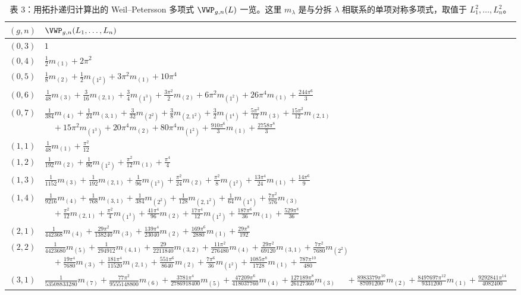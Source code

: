 \clearpage
\begin{table}[t]\centering\small
\caption*{表 3：用拓扑递归计算出的 Weil--Petersson 多项式 $\VWP_{g,n}(L)$ 一览。这里 $m_\lambda$ 是与分拆 $\lambda$ 相联系的单项对称多项式，取值于 $L_1^2,\dots,L_n^2$。}
\begin{tabular}{@{}c|>{\raggedright\arraybackslash}p{\dimexpr\textwidth-2.9cm\relax}@{}}
\toprule
$(g,n)$ & $\VWP_{g,n}(L_1,\dots,L_n)$ \\
\midrule
$(0,3)$ & $1$ \\
$(0,4)$ & $\frac12m_{(1)}+2\pi^2$ \\
$(0,5)$ & $\frac18m_{(2)}+\frac12m_{(1^2)}+3\pi^2m_{(1)}+10\pi^4$ \\
$(0,6)$ & $\frac1{48}m_{(3)}+\frac3{16}m_{(2,1)}+\frac34m_{(1^3)}+\frac{3\pi^2}{2}m_{(2)}+6\pi^2m_{(1^2)}+26\pi^4m_{(1)}+\frac{244\pi^6}{3}$ \\
$(0,7)$ & $\frac1{384}m_{(4)}+\frac1{24}m_{(3,1)}+\frac3{32}m_{(2^2)}+\frac38m_{(2,1^2)}+\frac32m_{(1^4)}+\frac{5\pi^2}{12}m_{(3)}+\frac{15\pi^2}{12}m_{(2,1)}$ \newline
$\quad+15\pi^2m_{(1^3)}+20\pi^4m_{(2)}+80\pi^4m_{(1^2)}+\frac{910\pi^6}{3}m_{(1)}+\frac{2758\pi^8}{3}$ \\
\midrule
$(1,1)$ & $\frac1{48}m_{(1)}+\frac{\pi^2}{12}$ \\
$(1,2)$ & $\frac1{192}m_{(2)}+\frac1{96}m_{(1^2)}+\frac{\pi^2}{12}m_{(1)}+\frac{\pi^4}{4}$ \\
$(1,3)$ & $\frac1{1152}m_{(3)}+\frac1{192}m_{(2,1)}+\frac1{96}m_{(1^3)}+\frac{\pi^2}{24}m_{(2)}+\frac{\pi^2}{8}m_{(1^2)}+\frac{13\pi^4}{24}m_{(1)}+\frac{14\pi^6}{9}$ \\
$(1,4)$ & $\frac1{9216}m_{(4)}+\frac1{768}m_{(3,1)}+\frac1{384}m_{(2^2)}+\frac1{128}m_{(2,1^2)}+\frac1{64}m_{(1^4)}+\frac{7\pi^2}{576}m_{(3)}$ \newline
$\quad+\frac{\pi^2}{12}m_{(2,1)}+\frac{\pi^2}{4}m_{(1^3)}+\frac{41\pi^4}{96}m_{(2)}+\frac{17\pi^4}{12}m_{(1^2)}+\frac{187\pi^6}{36}m_{(1)}+\frac{529\pi^8}{36}$ \\
\midrule
$(2,1)$ & $\frac1{442368}m_{(4)}+\frac{29\pi^2}{138240}m_{(3)}+\frac{139\pi^4}{23040}m_{(2)}+\frac{169\pi^6}{2880}m_{(1)}+\frac{29\pi^8}{192}$ \\
$(2,2)$ & $\frac1{4423680}m_{(5)}+\frac1{294912}m_{(4,1)}+\frac{29}{2211840}m_{(3,2)}+\frac{11\pi^2}{276480}m_{(4)}+\frac{29\pi^2}{69120}m_{(3,1)}+\frac{7\pi^2}{7680}m_{(2^2)}$ \newline
$\quad+\frac{19\pi^4}{7680}m_{(3)}+\frac{181\pi^4}{11520}m_{(2,1)}+\frac{551\pi^6}{8640}m_{(2)}+\frac{7\pi^6}{36}m_{(1^2)}+\frac{1085\pi^8}{1728}m_{(1)}+\frac{787\pi^{10}}{480}$ \\
\midrule
$(3,1)$ & $\frac1{53508833280}m_{(7)}+\frac{77\pi^2}{9555148800}m_{(6)}+\frac{3781\pi^4}{2786918400}m_{(5)}+\frac{47209\pi^6}{418037760}m_{(4)}+\frac{127189\pi^8}{26127360}m_{(3)}$ \newline
$\quad+\frac{8983379\pi^{10}}{87091200}m_{(2)}+\frac{8497697\pi^{12}}{9331200}m_{(1)}+\frac{9292841\pi^{14}}{4082400}$ \\
\bottomrule
\end{tabular}
\end{table}
